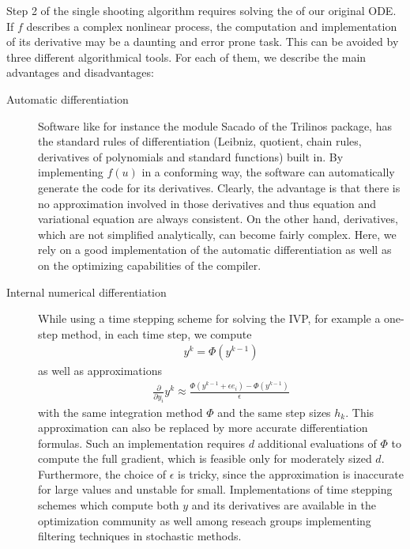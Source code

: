 \begin{remark}
  Step 2 of the single shooting algorithm requires solving the
   of our original ODE. If $f$
  describes a complex nonlinear process, the computation and
  implementation of its derivative may be a daunting and error prone
  task. This can be avoided by three different algorithmical
  tools. For each of them, we describe the main advantages and
  disadvantages:
  \begin{description}
  \item[Automatic differentiation] Software like for instance
    the module Sacado of the Trilinos package, has the standard rules
    of differentiation (Leibniz, quotient, chain rules, derivatives of
    polynomials and standard functions) built in. By implementing
    $f(u)$ in a conforming way, the software can automatically
    generate the code for its derivatives. Clearly, the advantage is
    that there is no approximation involved in those derivatives and
    thus equation and variational equation are always consistent. On
    the other hand, derivatives, which are not simplified
    analytically, can become fairly complex. Here, we rely on a good
    implementation of the automatic differentiation as well as on the
    optimizing capabilities of the compiler.
  \item[Internal numerical differentiation] While using a time
    stepping scheme for solving the IVP, for example a one-step
    method, in each time step, we compute
      \begin{gather*}
        y^k = \Phi(y^{k-1})
      \end{gather*}
      as well as approximations
      \begin{gather*}
        \frac{\partial}{\partial y_i} y^k
        \approx \frac{\Phi(y^{k-1}+\epsilon e_i) - \Phi(y^{k-1})}{\epsilon}
      \end{gather*}
with the same integration method $\Phi$ and the same step sizes $h_k$.       This approximation can also be replaced by more accurate
      differentiation formulas. Such an implementation requires $d$
      additional evaluations of $\Phi$ to compute the full gradient,
      which is feasible only for moderately sized $d$. Furthermore,
      the choice of $\epsilon$ is tricky, since the approximation is
      inaccurate for large values and unstable for small.
      Implementations of time stepping schemes which compute both $y$
      and its derivatives are available in the optimization community
      as well among reseach groups implementing filtering techniques
      in stochastic methods.
      

\end{description}
\end{remark}
